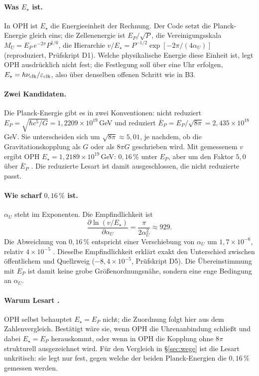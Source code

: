 \paragraph{Was $E_\star$ ist.} In OPH ist $E_\star$ die Energieeinheit der
Rechnung. Der Code setzt die Planck-Energie gleich eins; die Zellenenergie ist
$E_P/\sqrt P$, die Vereinigungsskala $M_U=E_P\,e^{-2\pi}P^{1/6}$, die Hierarchie
$v/E_\star=P^{-1/2}\exp[-2\pi/(4\alpha_U)]$ (reproduziert, Prüfskript D1). Welche
physikalische Energie diese Einheit ist, legt OPH ausdrücklich nicht fest; die
Festlegung soll über eine Uhr erfolgen, $E_\star=h\nu_{\rm clk}/\varepsilon_{\rm clk}$,
also über denselben offenen Schritt wie in B3.

\paragraph{Zwei Kandidaten.} Die Planck-Energie gibt es in zwei Konventionen:
nicht reduziert $E_P=\sqrt{\hbar c^5/G}=1{,}2209\times10^{19}$\,GeV und
reduziert $\bar E_P=E_P/\sqrt{8\pi}=2{,}435\times10^{18}$\,GeV. Sie
unterscheiden sich um $\sqrt{8\pi}\approx5{,}01$, je nachdem, ob die
Gravitationskopplung als $G$ oder als $8\pi G$ geschrieben wird. Mit gemessenem
$v$ ergibt OPH $E_\star=1{,}2189\times10^{19}$\,GeV: $0{,}16\,\%$ unter $E_P$,
aber um den Faktor $5{,}0$ über $\bar E_P$ \KM. Die reduzierte Lesart ist damit
ausgeschlossen, die nicht reduzierte passt.

\paragraph{Wie scharf $0{,}16\,\%$ ist.} $\alpha_U$ steht im Exponenten. Die
Empfindlichkeit ist
\begin{equation}
  \frac{\partial\ln(v/E_\star)}{\partial\alpha_U}=\frac{\pi}{2\alpha_U^2}\approx929 .
\end{equation}
Die Abweichung von $0{,}16\,\%$ entspricht einer Verschiebung von $\alpha_U$ um
$1{,}7\times10^{-6}$, relativ $4\times10^{-5}$ \BM. Dieselbe Empfindlichkeit
erklärt exakt den Unterschied zwischen öffentlichem und Quellzweig
($-8{,}4\times10^{-5}$, Prüfskript D5). Die Übereinstimmung mit $E_P$ ist
damit keine grobe Größenordnungsnähe, sondern eine enge Bedingung an $\alpha_U$.

\paragraph{Warum Lesart \SM.} OPH selbst behauptet $E_\star=E_P$ nicht; die
Zuordnung folgt hier aus dem Zahlenvergleich. Bestätigt wäre sie, wenn OPH die
Uhrenanbindung schließt und dabei $E_\star=E_P$ herauskommt, oder wenn in OPH
die Kopplung ohne $8\pi$ strukturell ausgezeichnet wird. Für den Vergleich in
§\ref{sec:wege} ist die Lesart unkritisch: sie legt nur fest, gegen welche der
beiden Planck-Energien die $0{,}16\,\%$ gemessen werden.

